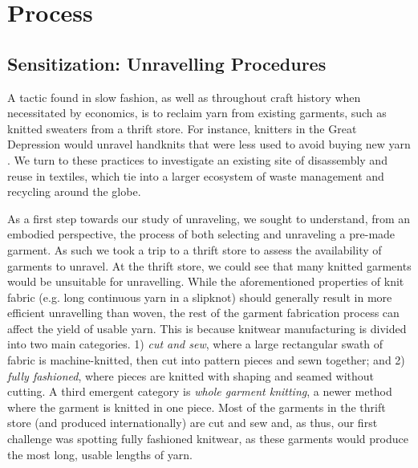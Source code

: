 \section{Process}

\subsection{Sensitization: Unravelling Procedures}
A tactic found in slow fashion, as well as throughout craft history when necessitated by economics, is to reclaim yarn from existing garments, such as knitted sweaters from a thrift store. For instance, knitters in the Great Depression would unravel handknits that were less used to avoid buying new yarn \cite{black_knitting:_2012}. We turn to these practices to investigate an existing site of disassembly and reuse in textiles, which tie into a larger ecosystem of waste management and recycling around the globe.

As a first step towards our study of unraveling, we sought to understand, from an embodied perspective, the process of both selecting and unraveling a pre-made garment. As such we took a trip to a thrift store to assess the availability of garments to unravel. At the thrift store, we could see that many knitted garments would be unsuitable for unravelling. While the aforementioned properties of knit fabric (e.g. long continuous yarn in a slipknot) should generally result in more efficient unravelling than woven, the rest of the garment fabrication process can affect the yield of usable yarn. This is because knitwear manufacturing is divided into two main categories. 1) \emph{cut and sew}, where a large rectangular swath of fabric is machine-knitted, then cut into pattern pieces and sewn together; and 2) \emph{fully fashioned}, where pieces are knitted with shaping and seamed without cutting. A third emergent category is \emph{whole garment knitting}, a newer method where the garment is knitted in one piece.  Most of the garments in the thrift store (and produced internationally) are cut and sew and, as thus, our first challenge was spotting fully fashioned knitwear, as these garments would produce the most long, usable lengths of yarn. 

